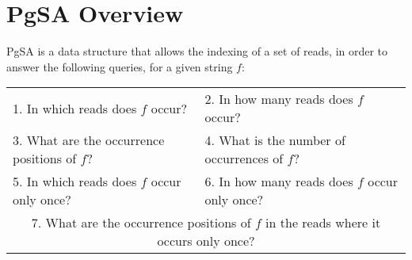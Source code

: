 \documentclass[long, final]{jobim2017}
\begin{document}
\section{PgSA Overview}
\label{sec:PgSAO}

PgSA is a data structure that allows the indexing of a set of reads, in order to answer the following queries, for a given string $f$:



\begin{center}
	\begin{tabular}{p{}p{}}
		1. In which reads does $f$ occur? & 2. In how many reads does $f$ occur? \\
		3. What are the occurrence positions of $f$? & 4. What is the number of occurrences of $f$? \\
		5. In which reads does $f$ occur only once? & 6. In how many reads does $f$ occur only once? \\
		\multicolumn{2}{c}{7. What are the occurrence positions of $f$ in the reads where it occurs only once?} \\
	\end{tabular} \\
\end{center}
\end{document}
